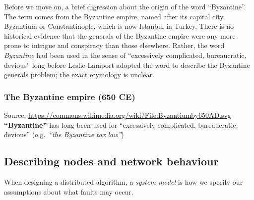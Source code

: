 Before we move on, a brief digression about the origin of the word ``Byzantine''.
The term comes from the Byzantine empire, named after its capital city Byzantium or Constantinople, which is now Istanbul in Turkey.
There is no historical evidence that the generals of the Byzantine empire were any more prone to intrigue and conspiracy than those elsewhere.
Rather, the word \emph{Byzantine} had been used in the sense of ``excessively complicated, bureaucratic, devious'' long before Leslie Lamport adopted the word to describe the Byzantine generals problem; the exact etymology is unclear.

\pagebreak[3]
\begin{frame}
    \label{s:byzantine-empire}
    \frametitle{The Byzantine empire (650 CE)}
    {\scriptsize Source: \url{https://commons.wikimedia.org/wiki/File:Byzantiumby650AD.svg}}\\[1em]
    \textbf{``Byzantine''} has long been used for ``excessively complicated, bureaucratic, devious'' (e.g.\ \emph{``the Byzantine tax law''})
\end{frame}
\label{l:byzantine-empire}

\subsection{Describing nodes and network behaviour}\label{sec:system-behaviour}

When designing a distributed algorithm, a \emph{system model} is how we specify our assumptions about what faults may occur.

